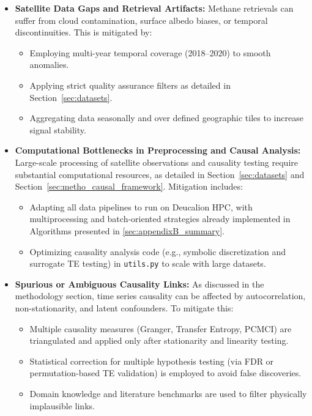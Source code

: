 \begin{itemize}
	\item \textbf{Satellite Data Gaps and Retrieval Artifacts:} Methane retrievals can suffer from cloud contamination, surface albedo biases, or temporal discontinuities. This is mitigated by:
	      \begin{itemize}
		      \item Employing multi-year temporal coverage (2018–2020) to smooth anomalies.
		      \item Applying strict quality assurance filters as detailed in Section~\ref{sec:datasets}.
		      \item Aggregating data seasonally and over defined geographic tiles to increase signal stability.
	      \end{itemize}

	\item \textbf{Computational Bottlenecks in Preprocessing and Causal Analysis:} Large-scale processing of satellite observations and causality testing require substantial computational resources, as detailed in Section~\ref{sec:datasets} and Section~\ref{sec:metho_causal_framework}. Mitigation includes:
	      \begin{itemize}
		      \item Adapting all data pipelines to run on Deucalion HPC, with multiprocessing and batch-oriented strategies already implemented in Algorithms presented in \ref{sec:appendixB_summary}.
		      \item Optimizing causality analysis code (e.g., symbolic discretization and surrogate TE testing) in \texttt{utils.py} to scale with large datasets.
	      \end{itemize}

	\item \textbf{Spurious or Ambiguous Causality Links:} As discussed in the methodology section, time series causality can be affected by autocorrelation, non-stationarity, and latent confounders. To mitigate this:
	      \begin{itemize}
		      \item Multiple causality measures (Granger, Transfer Entropy, PCMCI) are triangulated and applied only after stationarity and linearity testing.
		      \item Statistical correction for multiple hypothesis testing (via FDR or permutation-based TE validation) is employed to avoid false discoveries.
		      \item Domain knowledge and literature benchmarks are used to filter physically implausible links.
	      \end{itemize}


\end{itemize}
